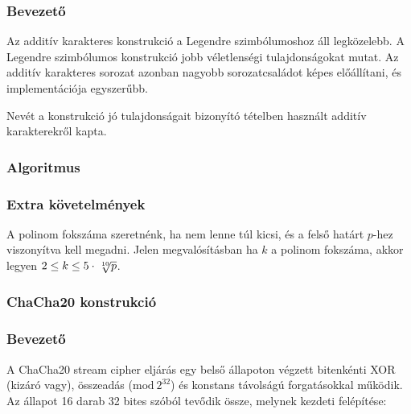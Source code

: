 \documentclass[12pt]{article}
\begin{document}
	\subsubsection*{Bevezető}
	Az additív karakteres konstrukció a Legendre szimbólumoshoz áll legközelebb. A Legendre szimbólumos konstrukció jobb véletlenségi tulajdonságokat mutat. Az additív karakteres sorozat azonban nagyobb sorozatcsaládot képes előállítani, és implementációja egyszerűbb.
	
	Nevét a konstrukció jó tulajdonságait bizonyító tételben használt additív karakterekről kapta.
	\subsubsection*{Algoritmus}
	\subsubsection*{Extra követelmények}
	A polinom fokszáma szeretnénk, ha nem lenne túl kicsi, és a felső határt $p$-hez viszonyítva kell megadni. Jelen megvalósításban ha $k$ a polinom fokszáma, akkor legyen $2 \leq k \leq 5\cdot\sqrt[\leftroot{-2}\uproot{2}10]{p}$.
	\subsubsection{ChaCha20 konstrukció}
	\subsubsection*{Bevezető}
	A ChaCha20 stream cipher eljárás egy belső állapoton végzett bitenkénti XOR (kizáró vagy), összeadás ($ \textrm{mod} \ 2^{32}$) és konstans távolságú forgatásokkal működik. Az állapot 16 darab 32 bites szóból tevődik össze, melynek kezdeti felépítése:
	
\end{document}
